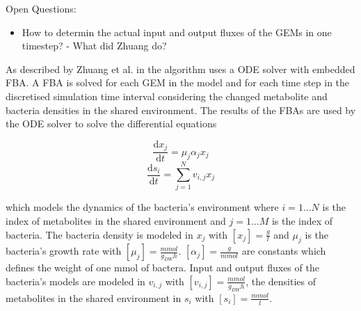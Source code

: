 \documentclass[a4paper,10pt]{article}
\begin{document}
%
% 

Open Questions:
\begin{itemize}
 \item How to determin the actual input and output fluxes of the GEMs in one timestep? - What did Zhuang do?
\end{itemize}

As described by Zhuang et al. in \cite{zhuang_genome-scale_2011} the algorithm uses a ODE solver with embedded FBA. A FBA is solved
for each GEM in the model and for each time step in the discretised simulation time interval considering the changed metabolite and
bacteria densities in the shared environment. The results of the FBAs are used by the ODE solver to solve the differential equations

\begin{equation} \label{eq:diff_eq_x}
 \frac{\mathrm d x_j}{\mathrm d t} = \mu_j \alpha_j x_j
\end{equation}
\begin{equation} \label{eq:diff_eq_s}
 \frac{\mathrm d s_i}{\mathrm d t} = \displaystyle\sum_{j=1}^{N} v_{i,j} x_j
\end{equation}

which models the dynamics of the bacteria's environment \cite{zhuang_design_2012} where $i = 1...N$ is the index of metabolites in the shared environment and $j = 1...M$ is the index of bacteria.
The bacteria density is modeled in $x_j$ with $\left[ x_j \right] = \frac{g}{l}$ and $\mu_j$ is the bacteria's growth rate with $\left[ \mu_j \right] = \frac{mmol}{g_{DW} h}$.
$\left[ \alpha_j \right] = \frac{g}{mmol}$ are constants which defines the weight of one mmol of bactera.
Input and output fluxes of the bacteria's models are modeled in $v_{i,j}$ with $\left[ v_{i,j} \right] = \frac{mmol}{g_{DW} h}$,
the densities of metabolites in the shared environment in $s_i$ with $\left[ s_i \right] = \frac{mmol}{l}$.
\end{document}
